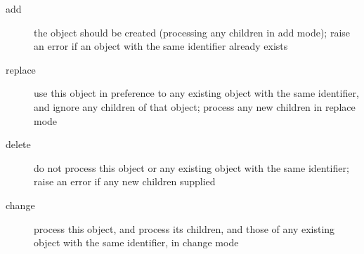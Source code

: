 \begin{reflist}
\begin{description}
\item[{add}]the object should be created (processing any children in add mode); raise an error if an object with the same identifier already exists
\item[{replace}]use this object in preference to any existing object with the same identifier, and ignore any children of that object; process any new children in replace mode
\item[{delete}]do not process this object or any existing object with the same identifier; raise an error if any new children supplied 
\item[{change}]process this object, and process its children, and those of any existing object with the same identifier, in change mode
\end{description} 
\end{reflist}  
